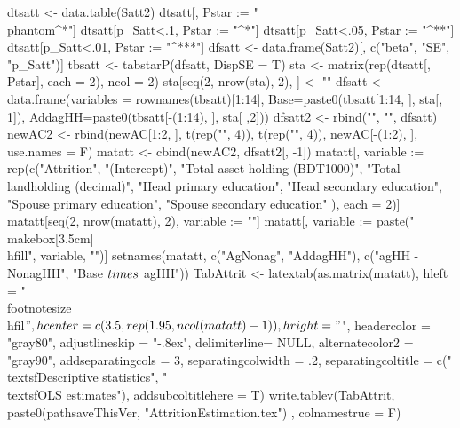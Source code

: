 \begin{Schunk}
\begin{Sinput}
dtsatt <- data.table(Satt2)
dtsatt[, Pstar := "\\phantom{^{*}}"]
dtsatt[p_Satt<.1, Pstar := "^{*}"]
dtsatt[p_Satt<.05, Pstar := "^{**}"]
dtsatt[p_Satt<.01, Pstar := "^{***}"]
dfsatt <- data.frame(Satt2)[, c("beta", "SE", "p_Satt")]
tbsatt <- tabstarP(dfsatt, DispSE = T)
sta <- matrix(rep(dtsatt[, Pstar], each = 2), ncol = 2)
sta[seq(2, nrow(sta), 2), ] <- ""
dfsatt <- data.frame(variables = rownames(tbsatt)[1:14], 
  Base=paste0(tbsatt[1:14, ], sta[, 1]), AddagHH=paste0(tbsatt[-(1:14), ], sta[ ,2]))
dfsatt2 <- rbind("", "", dfsatt)
newAC2 <- rbind(newAC[1:2, ], t(rep("", 4)), t(rep("", 4)), newAC[-(1:2), ], use.names = F)
matatt <- cbind(newAC2, dfsatt2[, -1])
matatt[, variable := 
rep(c("Attrition", "(Intercept)", "Total asset holding (BDT1000)", "Total landholding (decimal)", 
  "Head primary education", "Head secondary education", 
  "Spouse primary education", "Spouse secondary education"
  ), each = 2)]
matatt[seq(2, nrow(matatt), 2), variable := ""]
matatt[, variable := paste("\\makebox[3.5cm]{\\hfill", variable, "}")]
setnames(matatt, c("AgNonag", "AddagHH"), c("agHH - NonagHH", "Base $\\times$ agHH"))
TabAttrit <- latextab(as.matrix(matatt),
  hleft = "\\footnotesize\\hfil$", hcenter = c(3.5, rep(1.95, ncol(matatt)-1)), 
  hright = "$", 
  headercolor = "gray80", adjustlineskip = "-.8ex", delimiterline= NULL,
  alternatecolor2 = "gray90",
  addseparatingcols = 3, separatingcolwidth = .2,
  separatingcoltitle = c("\\textsf{Descriptive statistics}", "\\textsf{OLS estimates}"),
  addsubcoltitlehere = T)
write.tablev(TabAttrit,  
  paste0(pathsaveThisVer, "AttritionEstimation.tex")
  , colnamestrue = F)
\end{Sinput}
\end{Schunk}


